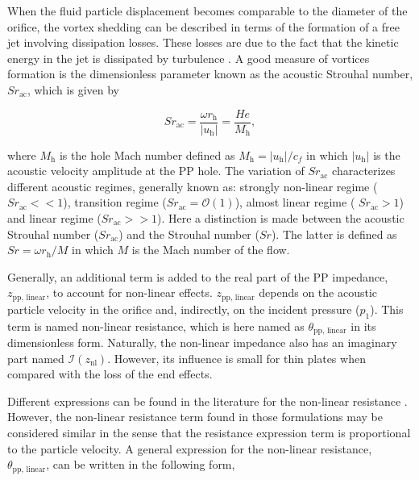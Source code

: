 \documentclass[12pt]{article}
\begin{document}
When the fluid particle displacement becomes comparable to the diameter of the orifice, the vortex shedding can be described in terms of the formation of a free jet involving dissipation losses. These losses are due to the fact that the kinetic energy in the jet is dissipated by turbulence \cite{elnady_2003}. A good measure of vortices formation is the dimensionless parameter known as the acoustic Strouhal number, $Sr_{\text{ac}}$, which is given by

\begin{equation}
	Sr_{\text{ac}} = \frac{\omega r_{\text{h}}}{|u_{\text{h}}|} = \frac{He}{M_{\text{h}}},
\end{equation}

\noindent where $M_{\text{h}}$ is the hole Mach number defined as $M_{\text{h}} = |u_{\text{h}}|/c_f$ in which $|u_{\text{h}}|$ is the acoustic velocity amplitude at the PP hole. The variation of $Sr_{\text{ac}}$ characterizes different acoustic regimes, generally known as: strongly non-linear regime ($Sr_{\text{ac}} << 1$), transition regime ($Sr_{\text{ac}} = \mathcal{O}(1)$), almost linear regime (
$Sr_{\text{ac}} > 1$) \cite{TEMIZ} and linear regime ($Sr_{\text{ac}} >> 1$). Here a distinction is made between the acoustic Strouhal number ($Sr_{\text{ac}}$) and the Strouhal number ($Sr$). The latter is defined as $Sr = \omega r_{\text{h}} / M$ in which $M$ is the Mach number of the flow.

Generally, an additional term is added to the real part of the \acrshort{PP} impedance, $z_{\text{pp, linear}}$, to account for non-linear effects. $z_{\text{pp, linear}}$ depends on the acoustic particle velocity in the orifice and, indirectly, on the incident pressure ($p_1$). This term is named non-linear resistance, which is here named as $\theta_{\text{pp, linear}}$ in its dimensionless form. Naturally, the non-linear impedance also has an imaginary part named $\mathcal{I}(z_{\text{nl}})$. However, its influence is small for thin plates when compared with the loss of the end effects. 

Different expressions can be found in the literature for the non-linear resistance \cite{guess_1975, MELLING19731,elnady_2003, TEMIZ,zinn_1970}. However, the non-linear resistance term found in those formulations may be considered similar in the sense that the resistance expression term is proportional to the particle velocity. A general expression for the non-linear resistance, $\theta_{\text{pp, linear}}$, can be written in the following form, 
\end{document}
